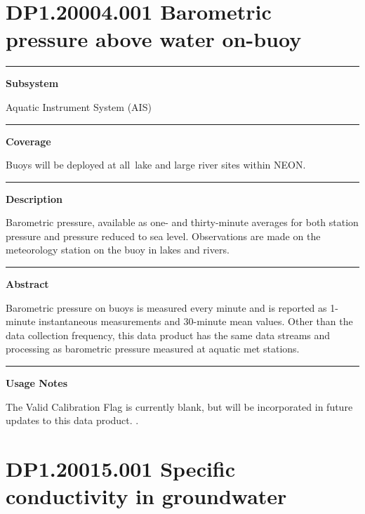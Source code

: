 \documentclass[]{article}
\begin{document}
\section{DP1.20004.001 Barometric pressure above water
on-buoy}\label{dp1.20004.001-barometric-pressure-above-water-on-buoy}

\begin{center}\rule{0.5\linewidth}{\linethickness}\end{center}

\textbf{Subsystem}

Aquatic Instrument System (AIS)

\begin{center}\rule{0.5\linewidth}{\linethickness}\end{center}

\textbf{Coverage}

Buoys will be deployed at all~lake and large river sites within NEON.

\begin{center}\rule{0.5\linewidth}{\linethickness}\end{center}

\textbf{Description}

Barometric pressure, available as one- and thirty-minute averages for
both station pressure and pressure reduced to sea level. Observations
are made on the meteorology station on the buoy in lakes and rivers.

\begin{center}\rule{0.5\linewidth}{\linethickness}\end{center}

\textbf{Abstract}

Barometric pressure on buoys is measured every minute and is reported as
1-minute instantaneous measurements and 30-minute mean values. Other
than the data collection frequency, this data product has the same data
streams and processing as barometric pressure measured at aquatic met
stations.

\begin{center}\rule{0.5\linewidth}{\linethickness}\end{center}

\textbf{Usage Notes}

The Valid Calibration Flag is currently blank, but will be incorporated
in future updates to this data product. \newpage
.

\section{DP1.20015.001 Specific conductivity in
groundwater}\label{dp1.20015.001-specific-conductivity-in-groundwater}
\end{document}
